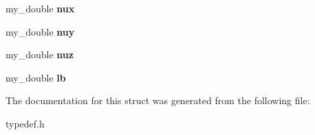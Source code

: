 \begin{DoxyCompactItemize}
\item 
\hypertarget{structoutput_a8aa40f976d30573ac58e8b42a9951fa8}{my\-\_\-double {\bfseries nux}}\label{structoutput_a8aa40f976d30573ac58e8b42a9951fa8}

\item 
\hypertarget{structoutput_a9fe3237bc0884a77d0bac4aad7295486}{my\-\_\-double {\bfseries nuy}}\label{structoutput_a9fe3237bc0884a77d0bac4aad7295486}

\item 
\hypertarget{structoutput_ac373eb34230e29a318f0bb89f09ac6dc}{my\-\_\-double {\bfseries nuz}}\label{structoutput_ac373eb34230e29a318f0bb89f09ac6dc}

\item 
\hypertarget{structoutput_ad485bcdf502203e29e219a42a6c15046}{my\-\_\-double {\bfseries lb}}\label{structoutput_ad485bcdf502203e29e219a42a6c15046}

\end{DoxyCompactItemize}


The documentation for this struct was generated from the following file\-:\begin{DoxyCompactItemize}
\item 
typedef.\-h\end{DoxyCompactItemize}
